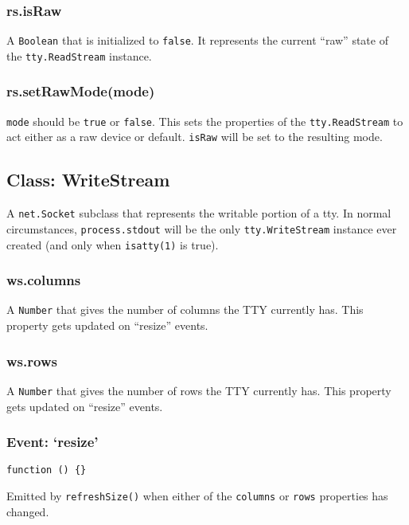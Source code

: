 \subsubsection{rs.isRaw}

A \texttt{Boolean} that is initialized to \texttt{false}. It represents
the current ``raw'' state of the \texttt{tty.ReadStream} instance.

\subsubsection{rs.setRawMode(mode)}

\texttt{mode} should be \texttt{true} or \texttt{false}. This sets the
properties of the \texttt{tty.ReadStream} to act either as a raw device
or default. \texttt{isRaw} will be set to the resulting mode.

\subsection{Class: WriteStream}

A \texttt{net.Socket} subclass that represents the writable portion of a
tty. In normal circumstances, \texttt{process.stdout} will be the only
\texttt{tty.WriteStream} instance ever created (and only when
\texttt{isatty(1)} is true).

\subsubsection{ws.columns}

A \texttt{Number} that gives the number of columns the TTY currently
has. This property gets updated on ``resize'' events.

\subsubsection{ws.rows}

A \texttt{Number} that gives the number of rows the TTY currently has.
This property gets updated on ``resize'' events.

\subsubsection{Event: `resize'}

\texttt{function () \{\}}

Emitted by \texttt{refreshSize()} when either of the \texttt{columns} or
\texttt{rows} properties has changed.

